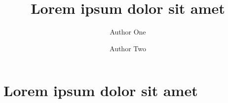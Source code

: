 \documentclass{amsart}
\begin{document}
\title{Lorem ipsum dolor sit amet}

\author[Author One]{Author One}
\author[Author Two]{Author Two}

\begin{abstract}
\lipsum[1] %
\end{abstract}

\maketitle

\section{Lorem ipsum dolor sit amet}
\lipsum %
\end{document}

